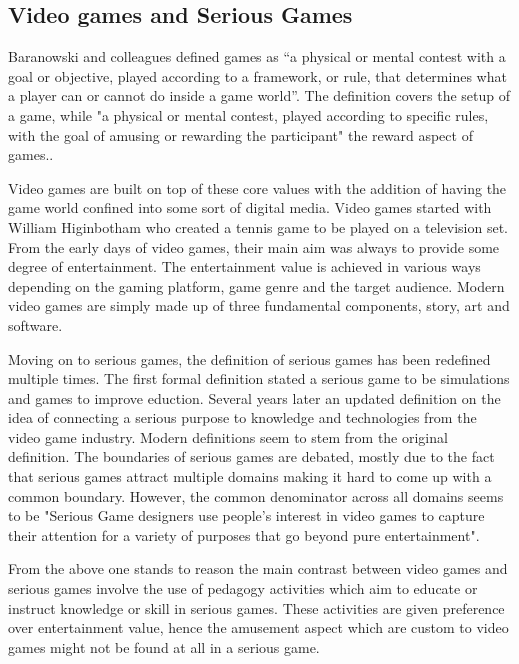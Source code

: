 \documentclass{article}
\begin{document}
\subsection{Video games and Serious Games}

Baranowski and colleagues defined games as “a physical or mental contest with a goal or objective, played according to a framework, or rule, that determines what a player can or cannot do inside a game world”. The definition covers the setup of a game, while "a physical or mental contest, played according to specific rules, with the goal of amusing or rewarding the participant" the reward aspect of games.\cite{yuserious}.

Video games are built on top of these core values with the addition of having the game world confined into some sort of digital media. Video games started with William Higinbotham who created a tennis game to be played on a television set\cite{stanton2015brief}. From the early days of video games, their main aim was always to provide some degree of entertainment. The entertainment value is achieved in various ways depending on the gaming platform, game genre and the target audience. Modern video games are simply made up of three fundamental components, story, art and software\cite{zyda2005visual}.

Moving on to serious games, the definition of serious games has been redefined multiple times. The first formal definition stated a serious game to be simulations and games to improve eduction\cite{abt1970}. Several years later an updated definition on the idea of connecting a serious purpose to knowledge and technologies from the video game industry\cite{michael2005serious}. Modern definitions seem to stem from the original definition\cite{michael2005serious}\cite{zyda2005visual}. The boundaries of serious games are debated, mostly due to the fact that serious games attract multiple domains making it hard to come up with a common boundary. However, the common denominator across all domains seems to be "Serious Game designers use people's interest in video games to capture their attention for a variety of purposes that go beyond pure entertainment"\cite{djaouti2011classifying}.

From the above one stands to reason the main contrast between video games and serious games involve the use of pedagogy activities which aim to educate or instruct knowledge or skill\cite{zyda2005visual} in serious games. These activities are given preference over entertainment value, hence the amusement aspect which are custom to video games might not be found at all in a serious game\cite{zyda2005visual}.
\end{document}

